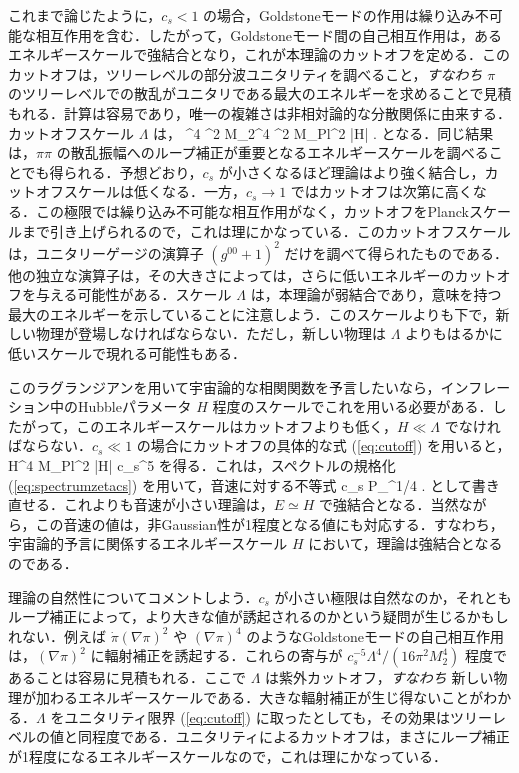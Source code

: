 これまで論じたように，$c_s <1$ の場合，Goldstoneモードの作用は繰り込み不可能な相互作用を含む．したがって，Goldstoneモード間の自己相互作用は，あるエネルギースケールで強結合となり，これが本理論のカットオフを定める．このカットオフは，ツリーレベルの部分波ユニタリティを調べること，{\em すなわち} $\pi$ のツリーレベルでの散乱がユニタリである最大のエネルギーを求めることで見積もれる．計算は容易であり，唯一の複雑さは非相対論的な分散関係に由来する．カットオフスケール $\Lambda$ は，
\be
\label{eq:cutoff}
\Lambda^4  \pi^2 M_2^4  
\pi^2 M_{\rm Pl}^2 |\dot H|
 \;.
\ee
となる．同じ結果は，$\pi \pi$ の散乱振幅へのループ補正が重要となるエネルギースケールを調べることでも得られる．予想どおり，$c_s$ が小さくなるほど理論はより強く結合し，カットオフスケールは低くなる．一方，$c_s \to 1$ ではカットオフは次第に高くなる．この極限では繰り込み不可能な相互作用がなく，カットオフをPlanckスケールまで引き上げられるので，これは理にかなっている．このカットオフスケールは，ユニタリーゲージの演算子 $(g^{00}+1)^2$ だけを調べて得られたものである．他の独立な演算子は，その大きさによっては，さらに低いエネルギーのカットオフを与える可能性がある．スケール $\Lambda$ は，本理論が弱結合であり，意味を持つ最大のエネルギーを示していることに注意しよう．このスケールよりも下で，新しい物理が登場しなければならない．ただし，新しい物理は $\Lambda$ よりもはるかに低いスケールで現れる可能性もある．

このラグランジアンを用いて宇宙論的な相関関数を予言したいなら，インフレーション中のHubbleパラメータ $H$ 程度のスケールでこれを用いる必要がある．したがって，このエネルギースケールはカットオフよりも低く，$H \ll
\Lambda$ でなければならない．$c_s
\ll 1$ の場合にカットオフの具体的な式 (\ref{eq:cutoff}) を用いると，
\be
H^4 \ll M_{\rm Pl}^2 |\dot H| c_s^5
\ee
を得る．これは，スペクトルの規格化 (\ref{eq:spectrumzetacs}) を用いて，音速に対する不等式
\be
c_s \gg P_\zeta^{1/4}  \;. 
\ee
として書き直せる．これよりも音速が小さい理論は，$E \simeq H$ で強結合となる．当然ながら，この音速の値は，非Gaussian性が1程度となる値にも対応する．すなわち，宇宙論的予言に関係するエネルギースケール $H$ において，理論は強結合となるのである．

理論の自然性についてコメントしよう．$c_s$ が小さい極限は自然なのか，それともループ補正によって，より大きな値が誘起されるのかという疑問が生じるかもしれない．例えば $\dot\pi(\nabla\pi)^2$ や $(\nabla\pi)^4$ のようなGoldstoneモードの自己相互作用は，$(\nabla\pi)^2$ に輻射補正を誘起する．これらの寄与が $c_s^{-5}
\Lambda^4/(16 \pi^2 M_2^4)$ 程度であることは容易に見積もれる．ここで $\Lambda$ は紫外カットオフ，{\em すなわち} 新しい物理が加わるエネルギースケールである．大きな輻射補正が生じ得ないことがわかる．$\Lambda$ をユニタリティ限界 (\ref{eq:cutoff}) に取ったとしても，その効果はツリーレベルの値と同程度である．ユニタリティによるカットオフは，まさにループ補正が1程度になるエネルギースケールなので，これは理にかなっている．


